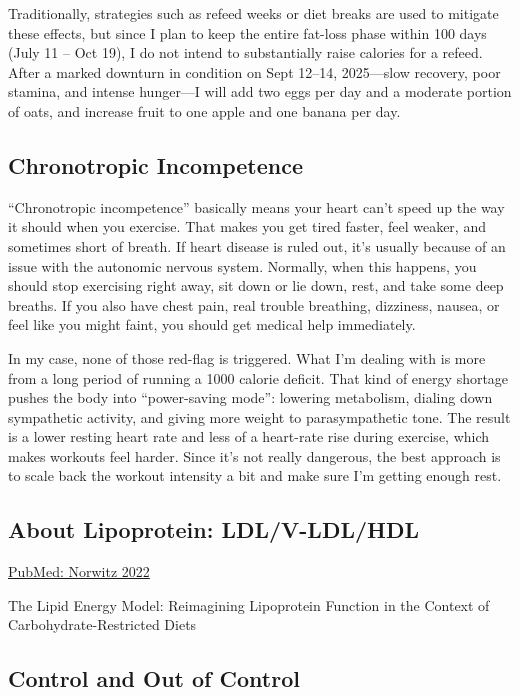 Traditionally, strategies such as refeed weeks or diet breaks are used to mitigate these effects, but since I plan to keep the entire fat-loss phase within 100 days (July 11 – Oct 19), I do not intend to substantially raise calories for a refeed. After a marked downturn in condition on Sept 12–14, 2025—slow recovery, poor stamina, and intense hunger—I will add two eggs per day and a moderate portion of oats, and increase fruit to one apple and one banana per day.

\subsection{Chronotropic Incompetence}
“Chronotropic incompetence” basically means your heart can’t speed up the way it should when you exercise. That makes you get tired faster, feel weaker, and sometimes short of breath. If heart disease is ruled out, it’s usually because of an issue with the autonomic nervous system. Normally, when this happens, you should stop exercising right away, sit down or lie down, rest, and take some deep breaths. If you also have chest pain, real trouble breathing, dizziness, nausea, or feel like you might faint, you should get medical help immediately.

In my case, none of those red-flag is triggered. What I’m dealing with is more from a long period of running a 1000 calorie deficit. That kind of energy shortage pushes the body into “power-saving mode”: lowering metabolism, dialing down sympathetic activity, and giving more weight to parasympathetic tone. The result is a lower resting heart rate and less of a heart-rate rise during exercise, which makes workouts feel harder. Since it’s not really dangerous, the best approach is to scale back the workout intensity a bit and make sure I’m getting enough rest.

\subsection{About Lipoprotein: LDL/V-LDL/HDL}
\href{https://pubmed.ncbi.nlm.nih.gov/35629964/}{PubMed: Norwitz 2022}

The Lipid Energy Model: Reimagining Lipoprotein Function in the Context of Carbohydrate-Restricted Diets



\subsection{Control and Out of Control}

